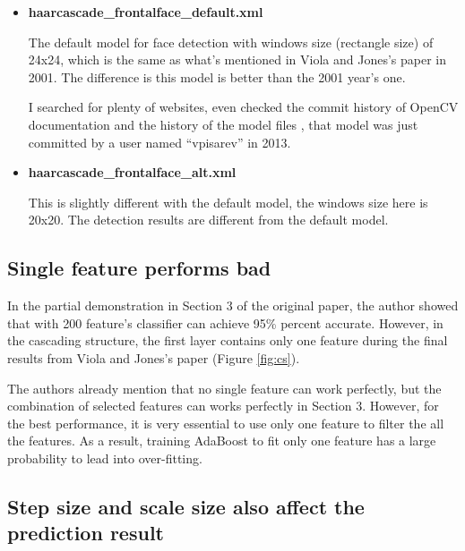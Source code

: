 \documentclass[10pt,twocolumn,letterpaper]{article}
\begin{document}
\begin{itemize}
    \item \textbf{haarcascade\_frontalface\_default.xml}

          The default model for face detection with windows size (rectangle size) of 24x24, which is the same as what's mentioned in Viola and Jones's paper in 2001.
          The difference is this model is better than the 2001 year's one.

          I searched for plenty of websites, even checked the commit history of OpenCV documentation \cite{opencvdochistory}
          and the history of the model files \cite{opencvmodelhistory}, that model was just committed by a user named ``vpisarev'' in 2013.

    \item \textbf{haarcascade\_frontalface\_alt.xml}

          This is slightly different with the default model, the windows size here is 20x20. The detection results are different from the default model.

\end{itemize}




\subsection{Single feature performs bad}
In the partial demonstration in Section 3 of the original paper, the author showed that with 200 feature's classifier can achieve 95\% percent accurate.
However, in the cascading structure, the first layer contains only one feature during the final results from Viola and Jones's paper (Figure \ref{fig:cs}).

The authors already mention that no single feature can work perfectly, but the combination of selected features can works perfectly in Section 3.
However, for the best performance, it is very essential to use only one feature to filter the all the features.
As a result, training AdaBoost to fit only one feature has a large probability to lead into over-fitting.

\subsection{Step size and scale size also affect the prediction result}
\end{document}
